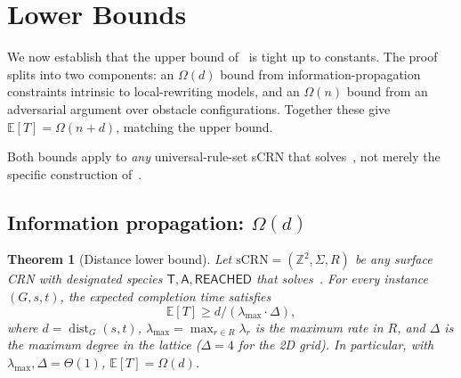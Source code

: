 \documentclass[11pt]{article}
\theoremstyle{plain}
\newtheorem{theorem}{Theorem}
\theoremstyle{definition}
\theoremstyle{remark}
\newcommand{\Z}{\mathbb{Z}}
\newcommand{\sCRN}{\text{sCRN}}
\DeclareMathOperator{\dist}{dist}
\begin{document}
\section{Lower Bounds}
\label{sec:lower}

We now establish that the upper bound of~ is tight up to constants. The proof splits into two components: an $\Omega(d)$ bound from information-propagation constraints intrinsic to local-rewriting models, and an $\Omega(n)$ bound from an adversarial argument over obstacle configurations. Together these give $\mathbb{E}[T] = \Omega(n + d)$, matching the upper bound.

Both bounds apply to \emph{any} universal-rule-set sCRN that solves~, not merely the specific construction of~.

\subsection{Information propagation: \texorpdfstring{$\Omega(d)$}{Ω(d)}}
\label{subsec:lower-d}

\begin{theorem}[Distance lower bound]
\label{thm:lower-d}
Let $\sCRN = (\Z^2, \Sigma, R)$ be any surface CRN with designated species $\mathsf{T}, \mathsf{A}, \mathsf{REACHED}$ that solves~. For every instance $(G, s, t)$, the expected completion time satisfies
\[
\mathbb{E}[T] \geq d / (\lambda_{\max} \cdot \Delta),
\]
where $d = \dist_G(s, t)$, $\lambda_{\max} = \max_{r \in R} \lambda_r$ is the maximum rate in $R$, and $\Delta$ is the maximum degree in the lattice ($\Delta = 4$ for the 2D grid). In particular, with $\lambda_{\max}, \Delta = \Theta(1)$, $\mathbb{E}[T] = \Omega(d)$.
\end{theorem}
\end{document}
